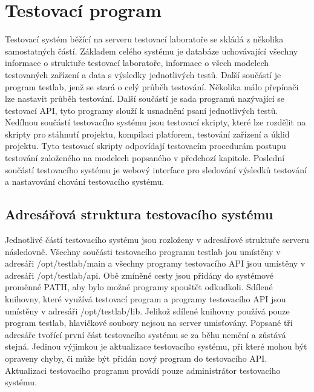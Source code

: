 \chapter{Testovací program}
Testovací systém běžící na serveru testovací laboratoře se skládá z několika samostatných částí. Základem celého systému je databáze uchovávající všechny informace o struktuře testovací laboratoře, informace o všech modelech testovaných zařízení a data s výsledky jednotlivých testů. Další součástí je program testlab, jenž se stará o celý průběh testování. Několika málo přepínači lze nastavit průběh testování. Další součástí je sada programů nazývající se testovací API, tyto programy slouží k usnadnění psaní jednotlivých testů. Nedílnou součástí testovacího systému jsou testovací skripty, které lze rozdělit na skripty pro stáhnutí projektu, kompilaci platforem, testování zařízení a úklid projektu. Tyto testovací skripty odpovídají testovacím procedurám postupu testování založeného na modelech popsaného v předchozí kapitole. Poslední součástí testovacího systému je webový interface pro sledování výsledků testování a nastavování chování testovacího systému.

\section{Adresářová struktura testovacího systému}

Jednotlivé částí testovacího systému jsou rozloženy v adresářové struktuře serveru následovně. Všechny součásti testovacího programu testlab jou umístěny v adresáři /opt/testlab/main a všechny programy testovacího API jsou umístěny v adresáři /opt/testlab/api. Obě zmíněné cesty jsou přidány do systémové proměnné PATH, aby bylo možné programy spouštět odkudkoli. Sdílené knihovny, které využívá testovací program a programy testovacího API jsou umístěny v adresáři /opt/testlab/lib. Jelikož sdílené knihovny používá pouze program testlab, hlavičkové soubory nejsou na server umisťovány. Popsané tři adresáře tvořící první část testovacího systému se za běhu nemění a zůstává stejná. Jedinou výjimkou je aktualizace testovacího systému, při které mohou být opraveny chyby, či může být přidán nový program do testovacího API. Aktualizaci testovacího programu provádí pouze administrátor testovacího systému.

